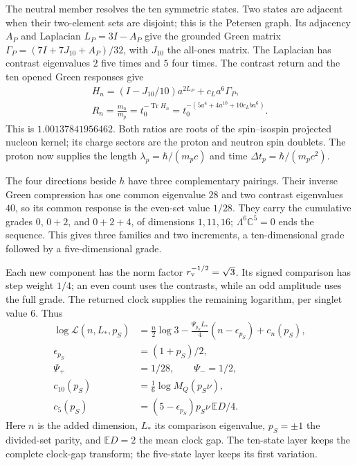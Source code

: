 \documentclass[aps,prx,reprint,longbibliography]{revtex4-2}
\providecommand{\Tr}{\operatorname{Tr}}
\providecommand{\E}{\mathbb E}
\begin{document}
The neutral member resolves the ten symmetric states. Two states are adjacent when their two-element sets are disjoint; this is the Petersen graph. Its adjacency $A_P$ and Laplacian $L_P=3I-A_P$ give the grounded Green matrix $\Gamma_P=(7I+7J_{10}+A_P)/32$, with $J_{10}$ the all-ones matrix. The Laplacian has contrast eigenvalues $2$ five times and $5$ four times. The contrast return and the ten opened Green responses give
\begin{equation}
 \begin{gathered}
 H_n=(I-J_{10}/10)a^{2L_P}+c_La^6\Gamma_P,\\
 R_n=\frac{m_n}{m_p}=t_0^{-\Tr H_n}
 =t_0^{-(5a^4+4a^{10}+10c_Lba^6)}.
 \end{gathered}
 \label{eq:Rn}
\end{equation}
This is $1.00137841956462$. Both ratios are roots of the spin--isospin projected nucleon kernel; its charge sectors are the proton and neutron spin doublets. The proton now supplies the length $\lambda_p=\hbar/(m_pc)$ and time $\Delta t_p=\hbar/(m_pc^2)$.

The four directions beside $h$ have three complementary pairings. Their inverse Green compression has one common eigenvalue $28$ and two contrast eigenvalues $40$, so its common response is the even-set value $1/28$. They carry the cumulative grades $0$, $0+2$, and $0+2+4$, of dimensions $1,11,16$; $\Lambda^6\mathbb C^5=0$ ends the sequence. This gives three families and two increments, a ten-dimensional grade followed by a five-dimensional grade.

Each new component has the norm factor $r_{\rm v}^{-1/2}=\sqrt3$. Its signed comparison has step weight $1/4$; an even count uses the contrasts, while an odd amplitude uses the full grade. The returned clock supplies the remaining logarithm, per singlet value $6$. Thus
\begin{equation}
\begin{aligned}
 \log\mathcal L(n,L_*,p_S)
 &=\frac n2\log3-\frac{\Psi_{p_S}L_*}{4}(n-\epsilon_{p_S})+c_n(p_S),\\
 \epsilon_{p_S}&=(1+p_S)/2,\\
 \Psi_+&=1/28,\qquad\Psi_-=1/2,\\
 c_{10}(p_S)&=\frac16\log M_Q(p_S\nu),\\
 c_5(p_S)&=(5-\epsilon_{p_S})p_S\nu\,\E D/4.
 \end{aligned}
 \label{eq:family_source}
\end{equation}
Here $n$ is the added dimension, $L_*$ its comparison eigenvalue, $p_S=\pm1$ the divided-set parity, and $\E D=2$ the mean clock gap. The ten-state layer keeps the complete clock-gap transform; the five-state layer keeps its first variation.
\end{document}
